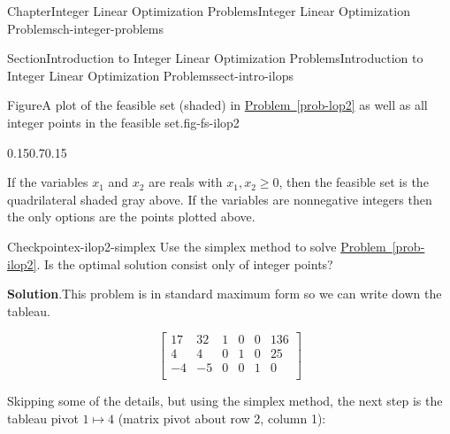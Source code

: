 \documentclass[oneside,10pt,]{book}
\newcommand{\blocktitlefont}{\relax}
\newcommand{\xreffont}{\relax}
\numberwithin{equation}{section}
\newcommand{\amp}{&}
\begin{document}
\begin{chapterptx}{Chapter}{Integer Linear Optimization Problems}{}{Integer Linear Optimization Problems}{}{}{ch-integer-problems}
\begin{sectionptx}{Section}{Introduction to Integer Linear Optimization Problems}{}{Introduction to Integer Linear Optimization Problems}{}{}{sect-intro-ilops}
\begin{figureptx}{Figure}{A plot of the feasible set (shaded) in \hyperref[prob-lop2]{Problem~{\xreffont\ref{prob-lop2}}} as well as all integer points in the feasible set.}{fig-fs-ilop2}{}
\begin{image}{0.15}{0.7}{0.15}{}%
%
\end{image}%
\tcblower
\end{figureptx}%
If the variables \(x_1\) and \(x_2\) are reals with \(x_1, x_2 \geq 0\), then the feasible set is the quadrilateral shaded gray above. If the variables are nonnegative integers then the only options are the points plotted above.%
\begin{inlineexercise}{Checkpoint}{}{ex-ilop2-simplex}%
Use the simplex method to solve \hyperref[prob-ilop2]{Problem~{\xreffont\ref{prob-ilop2}}}. Is the optimal solution consist only of integer points?%
\par\smallskip%
\noindent\textbf{\blocktitlefont Solution}.\hypertarget{ex-ilop2-simplex-2}{}\quad{}This problem is in standard maximum form so we can write down the tableau.%
\par
%
\begin{equation*}
\left[\begin{array}{rr|rrr|r} 17 \amp 32 \amp 1 \amp 0 \amp 0 \amp 136\\ 4 \amp 4 \amp 0 \amp 1 \amp 0 \amp 25\\ \hline -4 \amp -5 \amp 0 \amp 0 \amp 1 \amp 0\\ \end{array} \right]
\end{equation*}
%
\par
Skipping some of the details, but using the simplex method, the next step is the tableau pivot \(1 \mapsto 4\) (matrix pivot about row 2, column 1):%
\par
%
\begin{equation*}

\end{equation*}
\end{inlineexercise}
\end{sectionptx}
\end{chapterptx}
\end{document}
